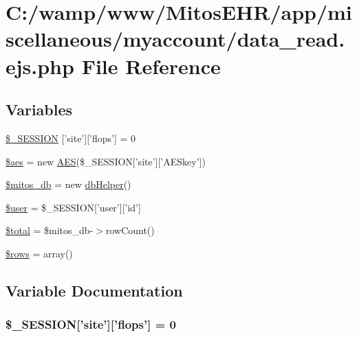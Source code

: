 \hypertarget{miscellaneous_2myaccount_2data__read_8ejs_8php}{\section{\-C\-:/wamp/www/\-Mitos\-E\-H\-R/app/miscellaneous/myaccount/data\-\_\-read.ejs.\-php \-File \-Reference}
\label{miscellaneous_2myaccount_2data__read_8ejs_8php}
}
\subsection*{\-Variables}
\begin{DoxyCompactItemize}
\item 
\hyperlink{miscellaneous_2myaccount_2data__read_8ejs_8php_a99fda8552a3e58235643b79f5af3ded8}{\$\-\_\-\-S\-E\-S\-S\-I\-O\-N} \mbox{[}'site'\mbox{]}\mbox{[}'flops'\mbox{]} = 0
\item 
\hyperlink{miscellaneous_2myaccount_2data__read_8ejs_8php_ab30046a94291cd07e400855e9c786ef3}{\$aes} = new \hyperlink{class_a_e_s}{\-A\-E\-S}(\$\-\_\-\-S\-E\-S\-S\-I\-O\-N\mbox{[}'site'\mbox{]}\mbox{[}'\-A\-E\-Skey'\mbox{]})
\item 
\hyperlink{miscellaneous_2myaccount_2data__read_8ejs_8php_ab5d961f93efe4e2e8d8374f01dd6c65a}{\$mitos\-\_\-db} = new \hyperlink{classdb_helper}{db\-Helper}()
\item 
\hyperlink{miscellaneous_2myaccount_2data__read_8ejs_8php_a598ca4e71b15a1313ec95f0df1027ca5}{\$user} = \$\-\_\-\-S\-E\-S\-S\-I\-O\-N\mbox{[}'user'\mbox{]}\mbox{[}'id'\mbox{]}
\item 
\hyperlink{miscellaneous_2myaccount_2data__read_8ejs_8php_a241b818f48030b628685b2e5119c5624}{\$total} = \$mitos\-\_\-db-\/$>$row\-Count()
\item 
\hyperlink{miscellaneous_2myaccount_2data__read_8ejs_8php_ace2ec39e7df3899fa8df9640ec274b03}{\$rows} = array()
\end{DoxyCompactItemize}


\subsection{\-Variable \-Documentation}
\hypertarget{miscellaneous_2myaccount_2data__read_8ejs_8php_a99fda8552a3e58235643b79f5af3ded8}{
\subsubsection[{\$\-\_\-\-S\-E\-S\-S\-I\-O\-N}]{\setlength{\rightskip}{0pt plus 5cm}\$\-\_\-\-S\-E\-S\-S\-I\-O\-N\mbox{[}'site'\mbox{]}\mbox{[}'flops'\mbox{]} = 0}}\label{miscellaneous_2myaccount_2data__read_8ejs_8php_a99fda8552a3e58235643b79f5af3ded8}


